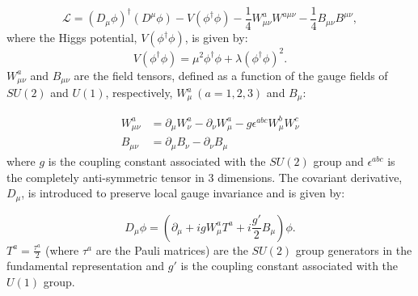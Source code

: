 \begin{equation}
\mathcal{L}=(D_{\mu}\phi)^{\dagger}(D^{\mu}\phi)-V(\phi^{\dagger} \phi)-\frac{1}{4} W_{\mu \nu}^a W^{a \mu \nu}-\frac{1}{4} B_{\mu \nu} B^{\mu \nu},
\label{eq:Lagragian}
\end{equation}
where the Higgs potential, $V(\phi^{\dagger} \phi)$, is given by:
\begin{equation}
V(\phi^{\dagger} \phi) = \mu^2 \phi^{\dagger} \phi + \lambda (\phi^{\dagger} \phi)^2.
\label{eq:higgsV}
\end{equation}
$W^a_{\mu\nu}$ and $B_{\mu\nu}$ are the field tensors, defined as a function of the gauge fields of $SU(2)$ and $U(1)$, respectively, $W^a_{\mu}~(a=1,2,3)$ and $B_{\mu}$:

\begin{align}
	W^a_{\mu\nu}&=\partial_{\mu}W^a_{\nu}-\partial_{\nu}W^a_{\mu}-g\epsilon^{abc}W^b_{\mu}W^c_{\nu} \\
	B_{\mu\nu}&=\partial_{\mu}B_{\nu}-\partial_{\nu}B_{\mu}
\end{align}
where $g$ is the coupling constant associated with the $SU(2)$ group and $\epsilon^{abc}$ is the completely anti-symmetric tensor in 3 dimensions. The covariant derivative, $D_{\mu}$, is introduced to preserve local gauge invariance and is given by:

\begin{equation}
	D_{\mu}\phi = \left(\partial_{\mu} + igW^a_{\mu}T^a + i\frac{g'}{2}B_{\mu}\right)\phi.
	\label{eq:covariant_derivative}
\end{equation}
$T^a=\frac{\tau^a}{2}$ (where $\tau^a$ are the Pauli matrices) are the $SU(2)$ group generators in the fundamental representation and $g'$ is the coupling constant associated with the $U(1)$ group.

